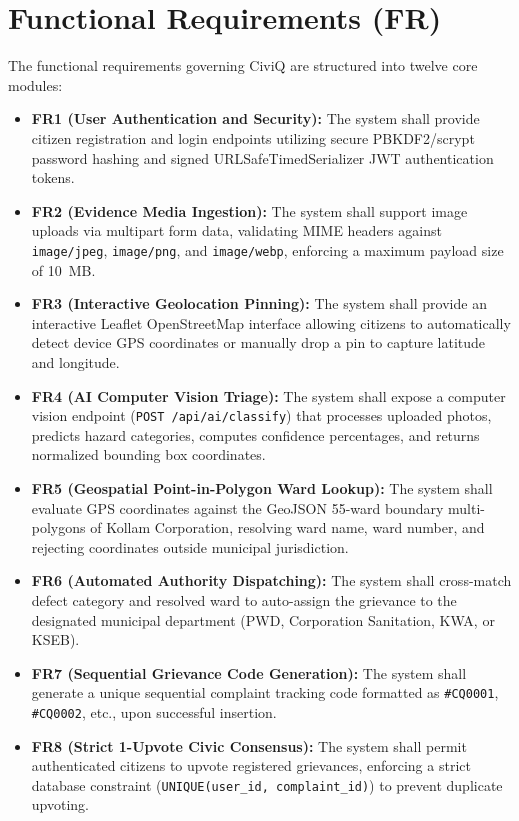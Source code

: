 \documentclass[12pt,a4paper]{report}
\begin{document}
\section{Functional Requirements (FR)}
The functional requirements governing CiviQ are structured into twelve core modules:
\begin{itemize}
    \item \textbf{FR1 (User Authentication and Security):} The system shall provide citizen registration and login endpoints utilizing secure PBKDF2/scrypt password hashing and signed URLSafeTimedSerializer JWT authentication tokens.
    \item \textbf{FR2 (Evidence Media Ingestion):} The system shall support image uploads via multipart form data, validating MIME headers against \texttt{image/jpeg}, \texttt{image/png}, and \texttt{image/webp}, enforcing a maximum payload size of 10~MB.
    \item \textbf{FR3 (Interactive Geolocation Pinning):} The system shall provide an interactive Leaflet OpenStreetMap interface allowing citizens to automatically detect device GPS coordinates or manually drop a pin to capture latitude and longitude.
    \item \textbf{FR4 (AI Computer Vision Triage):} The system shall expose a computer vision endpoint (\texttt{POST /api/ai/classify}) that processes uploaded photos, predicts hazard categories, computes confidence percentages, and returns normalized bounding box coordinates.
    \item \textbf{FR5 (Geospatial Point-in-Polygon Ward Lookup):} The system shall evaluate GPS coordinates against the GeoJSON 55-ward boundary multi-polygons of Kollam Corporation, resolving ward name, ward number, and rejecting coordinates outside municipal jurisdiction.
    \item \textbf{FR6 (Automated Authority Dispatching):} The system shall cross-match defect category and resolved ward to auto-assign the grievance to the designated municipal department (PWD, Corporation Sanitation, KWA, or KSEB).
    \item \textbf{FR7 (Sequential Grievance Code Generation):} The system shall generate a unique sequential complaint tracking code formatted as \texttt{\#CQ0001}, \texttt{\#CQ0002}, etc., upon successful insertion.
    \item \textbf{FR8 (Strict 1-Upvote Civic Consensus):} The system shall permit authenticated citizens to upvote registered grievances, enforcing a strict database constraint (\texttt{UNIQUE(user\_id, complaint\_id)}) to prevent duplicate upvoting.

\end{itemize}
\end{document}
